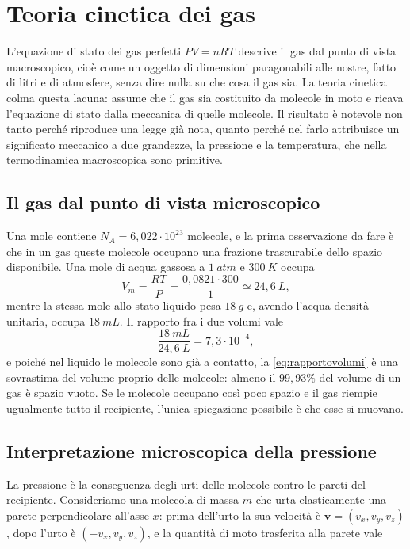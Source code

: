 \chapter{Teoria cinetica dei gas}

L'equazione di stato dei gas perfetti $PV = nRT$ descrive il gas dal punto di vista macroscopico, cioè come un oggetto di dimensioni paragonabili alle nostre, fatto di litri e di atmosfere, senza dire nulla su che cosa il gas sia.
La teoria cinetica colma questa lacuna: assume che il gas sia costituito da molecole in moto e ricava l'equazione di stato dalla meccanica di quelle molecole.
Il risultato è notevole non tanto perché riproduce una legge già nota, quanto perché nel farlo attribuisce un significato meccanico a due grandezze, la pressione e la temperatura, che nella termodinamica macroscopica sono primitive.

\section{Il gas dal punto di vista microscopico}

Una mole contiene $N_A = 6,022\cdot 10^{23}$ molecole, e la prima osservazione da fare è che in un gas queste molecole occupano una frazione trascurabile dello spazio disponibile.
Una mole di acqua gassosa a $1 \ atm$ e $300 \ K$ occupa
\begin{equation}
    V_m = \frac{RT}{P} = \frac{0,0821 \cdot 300}{1} \simeq 24,6 \ L,
    \label{eq:volumemolare}
\end{equation}
mentre la stessa mole allo stato liquido pesa $18 \ g$ e, avendo l'acqua densità unitaria, occupa $18 \ mL$.
Il rapporto fra i due volumi vale
\begin{equation}
    \frac{18 \ mL}{24,6 \ L} = 7,3\cdot 10^{-4},
    \label{eq:rapportovolumi}
\end{equation}
e poiché nel liquido le molecole sono già a contatto, la \eqref{eq:rapportovolumi} è una sovrastima del volume proprio delle molecole: almeno il $99{,}93\%$ del volume di un gas è spazio vuoto.
Se le molecole occupano così poco spazio e il gas riempie ugualmente tutto il recipiente, l'unica spiegazione possibile è che esse si muovano.

\section{Interpretazione microscopica della pressione}

La pressione è la conseguenza degli urti delle molecole contro le pareti del recipiente.
Consideriamo una molecola di massa $m$ che urta elasticamente una parete perpendicolare all'asse $x$: prima dell'urto la sua velocità è $\mathbf{v} = (v_x, v_y, v_z)$, dopo l'urto è $(-v_x, v_y, v_z)$, e la quantità di moto trasferita alla parete vale

